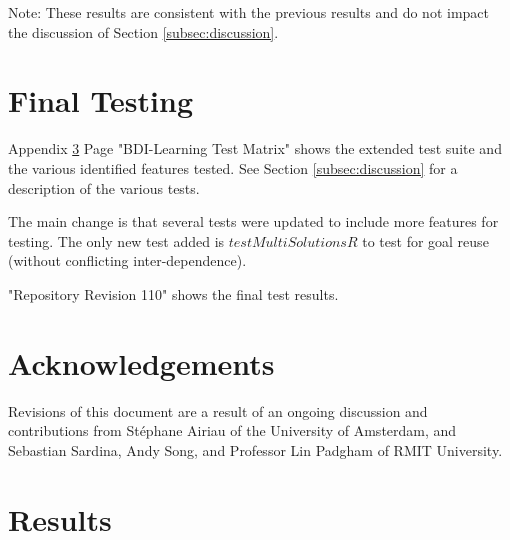 \documentclass[a4paper]{article}
\newcommand{\stephane}{{St\'ephane}\xspace}
\begin{document}
Note: These results are consistent with the previous results and do not impact the discussion of Section \ref{subsec:discussion}.

\section{Final Testing}

Appendix \ref{sec:results} Page "BDI-Learning Test Matrix" shows the extended test suite and the various identified features tested. See Section \ref{subsec:discussion} for a description of the various tests. 

The main change is that several tests were updated to include more features for testing. The only new test added is $testMultiSolutionsR$ to test for goal reuse (without conflicting inter-dependence). 

"Repository Revision 110" shows the final test results.

\section{Acknowledgements}

Revisions of this document are a result of an ongoing discussion and contributions from \stephane Airiau of the University of Amsterdam, and Sebastian Sardina, Andy Song, and Professor Lin Padgham of RMIT University.


 


\appendix

\section{Results}
\label{sec:results}









\end{document}
